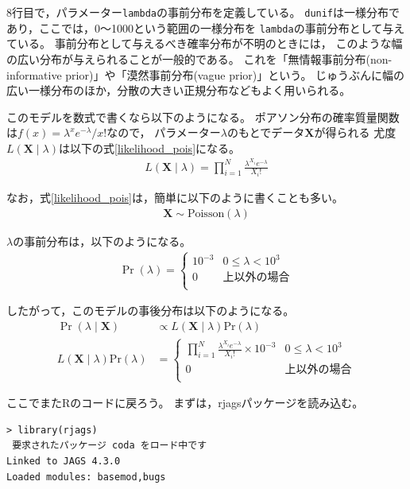 \documentclass[11pt,uplatex]{jsarticle}
\begin{document}
8行目で，パラメーター\texttt{lambda}の事前分布を定義している。
\texttt{dunif}は一様分布であり，ここでは，0〜1000という範囲の一様分布を
\texttt{lambda}の事前分布として与えている。
事前分布として与えるべき確率分布が不明のときには，
このような幅の広い分布が与えられることが一般的である。
これを「無情報事前分布(non-informative prior)」や「漠然事前分布(vague prior)」という。
じゅうぶんに幅の広い一様分布のほか，分散の大きい正規分布などもよく用いられる。

このモデルを数式で書くなら以下のようになる。
ポアソン分布の確率質量関数は$f(x)=\lambda^{x}e^{-\lambda}/x!$なので，
パラメーター$\lambda$のもとでデータ$\bm{X}$が得られる
尤度$L(\bm{X}  \mid  \lambda)$は以下の式\ref{likelihood_pois}になる。
\begin{align}
L(\bm{X} \mid \lambda) = \prod_{i = 1}^{N}\frac{\lambda^{X_{i}}e^{-\lambda}}{X_{i}!}
\label{likelihood_pois}
\end{align}

なお，式\ref{likelihood_pois}は，簡単に以下のように書くことも多い。
\begin{align*}
\bm{X} \sim \mathrm{Poisson}(\lambda)
\end{align*}

$\lambda$の事前分布は，以下のようになる。
\begin{align*}
\Pr(\lambda) = \begin{cases}
 10^{-3} & 0 \leq \lambda  < 10^{3}  \\
 0 & 上以外の場合 \\
\end{cases}
\end{align*}


したがって，このモデルの事後分布は以下のようになる。
\begin{align*}
\Pr(\lambda \mid \bm{X}) &\propto L(\bm{X} \mid \lambda) \mathrm{Pr}(\lambda) \\
L(\bm{X} \mid \lambda) \mathrm{Pr}(\lambda) &=\begin{cases}
 \prod_{i = 1}^{N}\frac{\lambda^{X_{i}}e^{-\lambda}}{X_{i}!} \times 10^{-3} & 0 \leq \lambda  < 10^{3}  \\
 0 & 上以外の場合  \label{posterior} \\
\end{cases}
\end{align*}

\vspace{1zw}

ここでまた\textsf{R}のコードに戻ろう。
まずは，\textsf{rjags}パッケージを読み込む。
\begin{lstlisting}
> library(rjags)
 要求されたパッケージ coda をロード中です 
Linked to JAGS 4.3.0
Loaded modules: basemod,bugs
\end{lstlisting}
\end{document}

